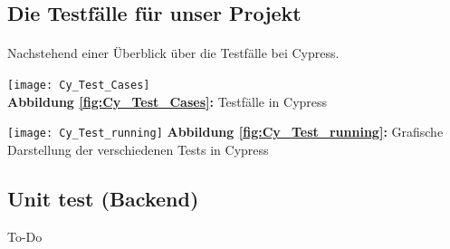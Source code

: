 \subsection{Die Testfälle für unser Projekt}
\paragraph{}
Nachstehend einer Überblick über die Testfälle bei Cypress.
\\
\begin{center}
\texttt{[image: Cy\_Test\_Cases]}\label{fig:Cy_Test_Cases}\\
\textbf{Abbildung \autoref{fig:Cy_Test_Cases}:} Testfälle in Cypress
\end{center}

\begin{center}
\texttt{[image: Cy\_Test\_running]}\label{fig:Cy_Test_running}
\textbf{Abbildung \autoref{fig:Cy_Test_running}:} Grafische Darstellung der verschiedenen Tests in Cypress
\end{center}



\subsection{Unit test (Backend)}
To-Do




